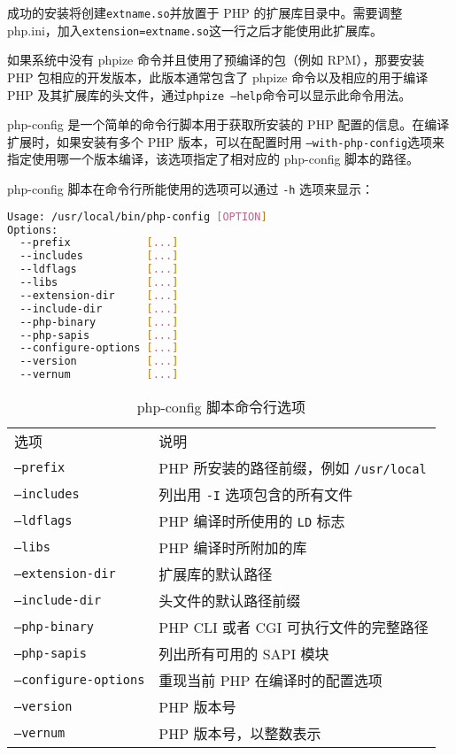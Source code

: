 \begin{compactitem}
成功的安装将创建\texttt{extname.so}并放置于 PHP 的扩展库目录中。需要调整 php.ini，加入\texttt{extension=extname.so}这一行之后才能使用此扩展库。

如果系统中没有 phpize 命令并且使用了预编译的包（例如 RPM），那要安装 PHP 包相应的开发版本，此版本通常包含了 phpize 命令以及相应的用于编译 PHP 及其扩展库的头文件，通过\texttt{phpize --help}命令可以显示此命令用法。

php-config 是一个简单的命令行脚本用于获取所安装的 PHP 配置的信息。在编译扩展时，如果安装有多个 PHP 版本，可以在配置时用 \texttt{--with-php-config}选项来指定使用哪一个版本编译，该选项指定了相对应的 php-config 脚本的路径。

php-config 脚本在命令行所能使用的选项可以通过 \texttt{-h} 选项来显示：

\begin{lstlisting}[language=bash]
Usage: /usr/local/bin/php-config [OPTION]
Options:
  --prefix            [...]
  --includes          [...]
  --ldflags           [...]
  --libs              [...]
  --extension-dir     [...]
  --include-dir       [...]
  --php-binary        [...]
  --php-sapis         [...]
  --configure-options [...]
  --version           [...]
  --vernum            [...]
\end{lstlisting}

\begin{table}[htbp]
\centering
\caption{php-config 脚本命令行选项}
\label{PHP_commandline}
\begin{tabular}{ll}
\hline
选项					&说明\\
\texttt{--prefix}			&PHP 所安装的路径前缀，例如 \texttt{/usr/local}\\
\texttt{--includes}		&列出用 \texttt{-I} 选项包含的所有文件\\
\texttt{--ldflags}		&PHP 编译时所使用的 \texttt{LD} 标志\\
\texttt{--libs}			&PHP 编译时所附加的库\\
\texttt{--extension-dir}	&扩展库的默认路径\\
\texttt{--include-dir}	&头文件的默认路径前缀\\
\texttt{--php-binary}	&PHP CLI 或者 CGI 可执行文件的完整路径\\
\texttt{--php-sapis}		&列出所有可用的 SAPI 模块\\
\texttt{--configure-options}	&重现当前 PHP 在编译时的配置选项\\
\texttt{--version}		&PHP 版本号\\
\texttt{--vernum}		&PHP 版本号，以整数表示\\
\end{tabular}
\end{table}


\end{compactitem}
